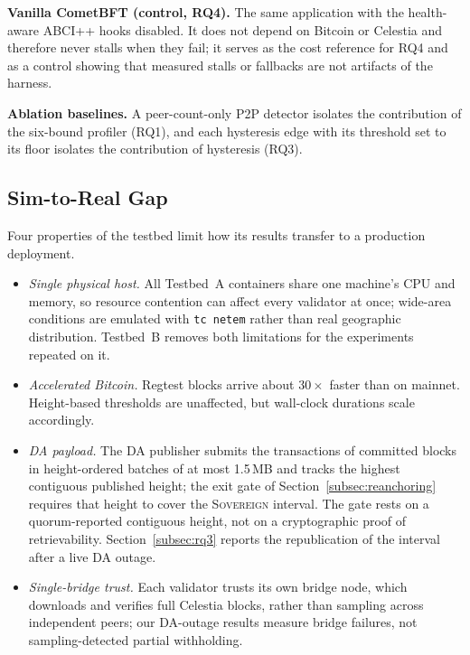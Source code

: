 \textbf{Vanilla CometBFT (control, RQ4).} The same application with the
health-aware ABCI++ hooks disabled. It does not depend on Bitcoin or
Celestia and therefore never stalls when they fail; it serves as the
cost reference for RQ4 and as a control showing that measured stalls or
fallbacks are not artifacts of the harness.

\textbf{Ablation baselines.} A peer-count-only P2P detector isolates the
contribution of the six-bound profiler (RQ1), and each hysteresis edge with
its threshold set to its floor isolates the contribution of hysteresis
(RQ3).

\subsection{Sim-to-Real Gap}
\label{subsec:sim-to-real}

Four properties of the testbed limit how its results transfer to a
production deployment.
\begin{itemize}
  \item \emph{Single physical host.} All Testbed~A containers share one
  machine's CPU and memory, so resource contention can affect every validator
  at once; wide-area conditions are emulated with \texttt{tc netem} rather
  than real geographic distribution.
  \iftestbedB Testbed~B removes both limitations for the experiments repeated
  on it.\fi
  \item \emph{Accelerated Bitcoin.} Regtest blocks arrive about $30\times$
  faster than on mainnet. Height-based thresholds are unaffected, but
  wall-clock durations scale accordingly.
  \item \emph{DA payload.} The DA publisher submits the transactions of
  committed blocks in height-ordered batches of at most 1.5\,MB and tracks
  the highest contiguous published height; the exit gate of
  Section~\ref{subsec:reanchoring} requires that height to cover the
  \textsc{Sovereign} interval. The gate rests on a quorum-reported
  contiguous height, not on a cryptographic proof of retrievability.
  Section~\ref{subsec:rq3} reports the republication of the interval after a
  live DA outage.
  \item \emph{Single-bridge trust.} Each validator trusts its own bridge
  node, which downloads and verifies full Celestia blocks, rather than
  sampling across independent peers; our DA-outage results measure bridge
  failures, not sampling-detected partial withholding.
\end{itemize}
